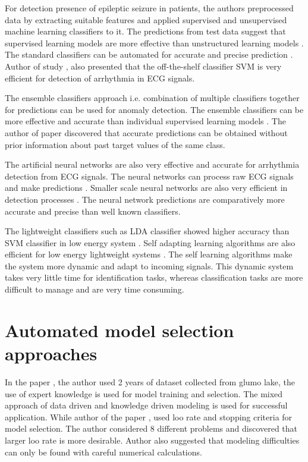 For detection presence of epileptic seizure in patients, the authors preprocessed data by
extracting suitable features and applied supervised and unsupervised machine learning
classifiers to it. The predictions from test data suggest that supervised learning models are
more effective than unstructured learning models \cite{siddiqui2020review}. The standard
classifiers can be automated for accurate and precise prediction \cite{imbrea2021automated}.
Author of study \cite{jha2020cardiac}, also presented that the off-the-shelf classifier SVM is
very efficient for detection of arrhythmia in ECG signals.

The ensemble classifiers approach i.e. combination of multiple classifiers together for
predictions can be used for anomaly detection. The ensemble classifiers can be more effective 
and accurate than individual supervised learning models
\cite{sun2020multi, liu2020parallel, huang2020accurate}. The author of paper
\cite{rajak2020applying} discovered that accurate predictions can be obtained without prior
information about past target values of the same class.

The artificial neural networks are also very effective and accurate for arrhythmia detection
from ECG signals. The neural networks can process raw ECG signals and make predictions
\cite{hannun2019cardiologist}. Smaller scale neural networks are also very efficient in
detection processes \cite{sannino2018deep}. The neural network predictions are comparatively
more accurate and precise than well known classifiers.

The lightweight classifiers such as LDA classifier showed higher accuracy than SVM classifier
in low energy system \cite{chen2013design}. Self adapting learning algorithms are also
efficient for low energy lightweight systems \cite{lei2007afc, owis2002study}. The self
learning algorithms make the system more dynamic and adapt to incoming signals. This dynamic
system takes very little time for identification tasks, whereas classification tasks are more
difficult to manage and are very time consuming.

\section{Automated model selection approaches} \label{sec:automated_model_selection_approaches}

In the paper \cite{natasa2008}, the author used 2 years of dataset collected from glumo lake,
the use of expert knowledge is used for model training and selection. The mixed approach of
data driven and knowledge driven modeling is used for successful application. While author
of the paper \cite{lee2000automatic}, used loo rate and stopping criteria for model
selection. The author considered 8 different problems and discovered that larger loo rate is
more desirable. Author also suggested that modeling difficulties can only be found with careful
numerical calculations.

